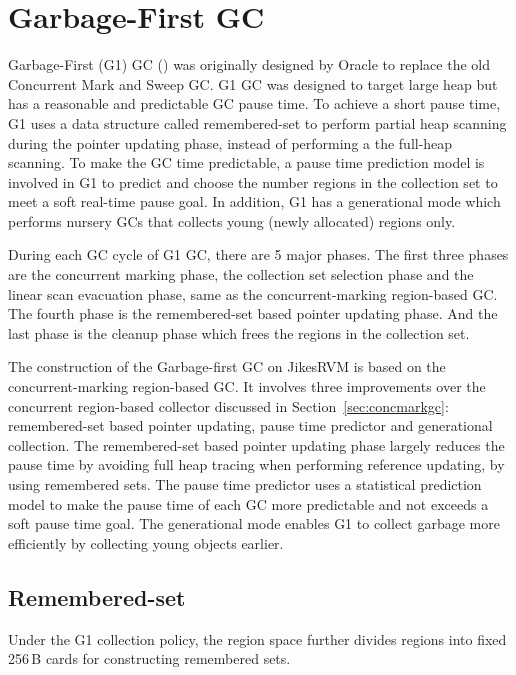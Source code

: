 \section{Garbage-First GC}
\label{sec:g1gc}

Garbage-First (G1) GC (\cite{detlefs2004garbage}) was originally designed by Oracle to replace
the old Concurrent Mark and Sweep GC. G1 GC was designed to target large heap but
has a reasonable and predictable GC pause time. To achieve a short pause time, G1
uses a data structure called remembered-set to perform partial heap scanning during the
pointer updating phase, instead of performing a the full-heap scanning. To make the GC time predictable,
a pause time prediction model is involved in G1 to predict and choose the number regions in the
collection set to meet a soft real-time pause goal. In addition, G1 has a generational
mode which performs nursery GCs that collects young (newly allocated) regions only.

During each GC cycle of G1 GC, there are 5 major phases.
The first three phases are the concurrent marking phase, the collection
set selection phase and the linear scan evacuation phase,
same as the concurrent-marking region-based GC.
The fourth phase is the remembered-set based pointer updating phase.
And the last phase is the cleanup phase which frees the regions in the collection set.

The construction of the Garbage-first GC on JikesRVM is based on the concurrent-marking
region-based GC.
It involves three improvements over the concurrent region-based collector discussed in Section~\ref{sec:concmarkgc}:
remembered-set based pointer updating, pause time predictor and generational collection.
The remembered-set based pointer updating phase largely reduces the pause time by
avoiding full heap tracing when performing reference updating, by using remembered sets.
The pause time predictor uses a statistical prediction model to make the pause time of each
GC more predictable and not exceeds a soft pause time goal.
The generational mode enables G1 to collect garbage more efficiently by collecting young objects earlier.

\subsection{Remembered-set}

Under the G1 collection policy, the region space further divides regions into fixed 256\,B cards for constructing remembered sets.


